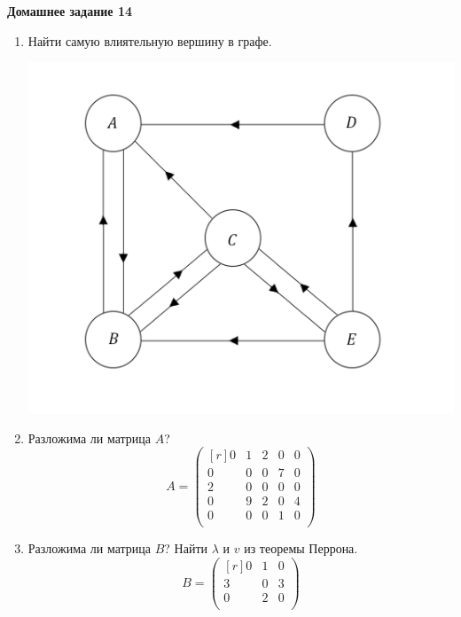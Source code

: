 \documentclass[12pt]{article}
\theoremstyle{definition}
\numberwithin{equation}{section}
\begin{document}
\textbf{Домашнее задание 14}\begin{enumerate}
\item Найти самую влиятельную вершину в графе.
\begin{center}
\includegraphics[scale=0.35]{l14_5_.png}\\
\end{center}
\item Разложима ли матрица $A$?
\[A = \begin{pmatrix}[r]
0 & 1 & 2 & 0 & 0\\
0 & 0 & 0 & 7 & 0\\
2 & 0 & 0 & 0 & 0\\
0 & 9 & 2 & 0 & 4\\
0 & 0 & 0 & 1 & 0\\
\end{pmatrix}\]
\item Разложима ли матрица $B$? Найти $\lambda$ и $v$ из теоремы Перрона.
\[B = \begin{pmatrix}[r]
0 & 1 & 0\\
3 & 0 & 3\\
0 & 2 & 0\\
\end{pmatrix}\]
\end{enumerate}
~\\
\end{document}

